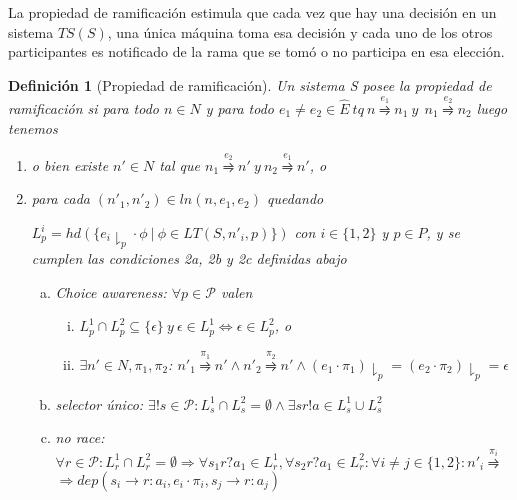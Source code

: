 \documentclass[paper=a4, fontsize=11pt, spanish]{scrartcl} %
\numberwithin{equation}{section} %
\numberwithin{figure}{section} %
\numberwithin{table}{section} %
\newtheorem{definition}{Definición}
\begin{document}
La propiedad de ramificación estimula que cada vez que hay una decisión en un sistema $TS(S)$, una única máquina toma esa decisión y cada uno de los otros participantes es notificado de la rama que se tomó o no participa en esa elección. 
 
\begin{definition}[Propiedad de ramificación] Un sistema S posee la propiedad de ramificación si para todo $n \in N$ y para todo $e_1 \neq e_2 \in \hat{E} \ \mathit{tq} \ n \overset{e_1}{\rightrightharpoons} n_1 \ \mathit{y} \  \ n_1 \overset{e_2}{\rightrightharpoons} n_2$ luego tenemos
\begin{enumerate}
\item o bien existe $n'\in N$ tal que $n_1 \overset{e_2}{\rightrightharpoons} n' \ \mathit{y} \ n_2 \overset{e_1}{\rightrightharpoons} n'$, o 
\item para cada $(n'_1, n'_2) \in ln(n, e_1, e_2)$ quedando 

$L_p^i = hd (\{e_i \downharpoonright_p \cdot \phi \  | \ \phi \in LT(S,n'_i,p) \} ) $ con $i \in \{1,2\}$ y $p \in P$, y se cumplen las condiciones 2a, 2b y 2c definidas abajo 	

\begin{enumerate}[(a)]
\item Choice awareness: $\forall p \in \mathcal{P}$ valen \begin{enumerate}[i.]
\item $L_p^1 \cap	L_p^2 \subseteq \{ \epsilon \} \ \mathit{y} \  \epsilon \in L_p^1 \iff \epsilon \in L_p^2$, o 
\item $\exists n' \in N, \pi_1, \pi_2$: $n'_1 \overset{\pi_1}{\rightrightharpoons} n' \land  n'_2 \overset{\pi_2}{\rightrightharpoons} n' \land (e_1 \cdot \pi_1) \downharpoonright_p= (e_2 \cdot \pi_2)\downharpoonright_p = \epsilon$
\end{enumerate}
\item selector único: $\exists!s \in \mathcal{P}: L_s^1 \cap L_s^2 = \emptyset \land \exists sr!a \in L_s^1 \cup L_s^2 $
\item no race: $\forall r \in \mathcal{P}: L_r^1\cap L_r^2 = \emptyset \Rightarrow \forall s_1r?a_1 \in L_r^1, \forall s_2r?a_1 \in L_r^2:\forall i \neq j \in \{1,2\}: n'_i \overset{\pi_i}\rightrightharpoons  $ \\
$\Rightarrow dep (s_i \rightarrow r: a_i, e_i \cdot \pi_i, s_j \rightarrow r: a_j) $
\end{enumerate}
\end{enumerate} 	
\end{definition}
\end{document}
